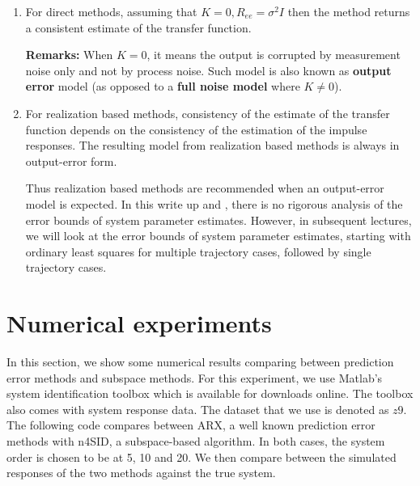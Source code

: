 \documentclass{article}[12pt]
\begin{document}
\begin{enumerate}
    \item For direct methods, assuming that $K = 0, R_{ee} = \sigma^2I$ then the method returns a consistent estimate of the transfer function.
    
    \textbf{Remarks:} When $K = 0$, it means the output is corrupted by measurement noise only and not by process noise. Such model is also known as \textbf{output error} model (as opposed to a \textbf{full noise model} where $K \neq 0$).
    
    \item For realization based methods, consistency of the estimate of the transfer function depends on the consistency of the estimation of the impulse responses. The resulting model from realization based methods is always in output-error form.
    
    Thus realization based methods are recommended when an output-error model is expected. In this write up and \cite{Viberg:1995:SMI:222618.222630}, there is no rigorous analysis of the error bounds of system parameter estimates. However, in subsequent lectures, we will look at the error bounds of system parameter estimates, starting with ordinary least squares for multiple trajectory cases, followed by single trajectory cases.
\end{enumerate}


\section{Numerical experiments}
In this section, we show some numerical results comparing between prediction error methods and subspace methods. For this experiment, we use Matlab's system identification toolbox which is available for downloads online. The toolbox also comes with system response data. The dataset that we use is denoted as $z9$. The following code compares between ARX, a well known prediction error methods with n4SID, a subspace-based algorithm. In both cases, the system order is chosen to be at 5, 10 and 20. We then compare between the simulated responses of the two methods against the true system.

~\\
\end{document}
